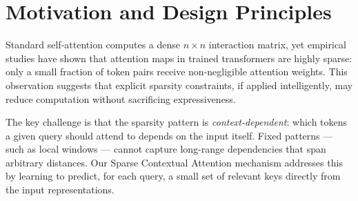 \section{Motivation and Design Principles}

Standard self-attention computes a dense $n \times n$ interaction matrix, yet empirical
studies \cite{clark2019does, kovaleva2019revealing} have shown that attention maps in
trained transformers are highly sparse: only a small fraction of token pairs receive
non-negligible attention weights. This observation suggests that explicit sparsity
constraints, if applied intelligently, may reduce computation without sacrificing
expressiveness.

The key challenge is that the sparsity pattern is \textit{context-dependent}:
which tokens a given query should attend to depends on the input itself. Fixed patterns
— such as local windows — cannot capture long-range dependencies that span arbitrary
distances. Our Sparse Contextual Attention mechanism addresses this by learning to
predict, for each query, a small set of relevant keys directly from the input
representations.
